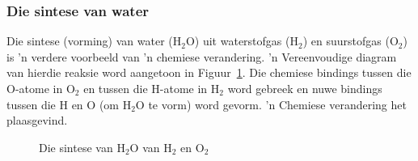 \subsubsection*{Die sintese van water}
\label{m38709*id62788}Die sintese (vorming) van water ($\text{H}_{2}\text{O}$) uit waterstofgas ($\text{H}_{2}$) en suurstofgas ($\text{O}_{2}$) is 'n verdere voorbeeld van 'n chemiese verandering. 'n Vereenvoudige diagram van hierdie reaksie word aangetoon in Figuur~\ref{fig:chemical change:synthesis}. Die chemiese bindings tussen die $\text{O}$-atome in $\text{O}_{2}$ en tussen die $\text{H}$-atome in $\text{H}_{2}$ word gebreek en nuwe bindings tussen die $\text{H}$ en $\text{O}$ (om $\text{H}_{2}\text{O}$ te vorm) word gevorm. 'n Chemiese verandering het plaasgevind.\par 
    \setcounter{subfigure}{0}
\begin{figure}[H]
\begin{center}
\end{center}
\caption{Die sintese van $\text{H}_{2}\text{O}$ van $\text{H}_{2}$ en $\text{O}_{2}$}
\label{fig:chemical change:synthesis}
\end{figure} 
\label{m38709*secfhsst!!!underscore!!!id163}


